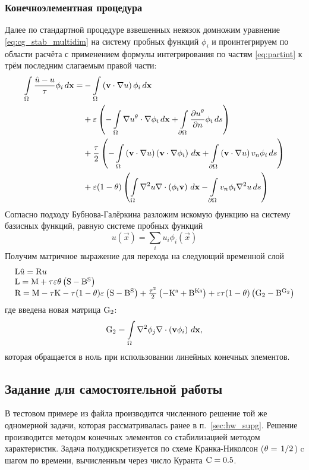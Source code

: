 \subsubsection{Конечноэлементная процедура}
Далее по стандартной процедуре взвешенных невязок
домножим уравнение \cref{eq:cg_stab_multidim} на систему пробных функций $\phi_i$
и проинтегрируем по области расчёта
с применением формулы интегрирования по частям \cref{eq:partint} к трём последним слагаемым правой части:
\begin{equation*}
\begin{split}
\displaystyle\int\limits_{\Omega}\frac{\hat u - u}{\tau}\phi_i \, d \boldsymbol{\rm x} = &
-\displaystyle\int\limits_{\Omega}\left(\boldsymbol{\rm v} \cdot \nabla u \right)\phi_i \, d \boldsymbol{\rm x} \\
&
+\varepsilon\left(
	-\displaystyle\int\limits_{\Omega}\nabla u^\theta \cdot \nabla \phi_i \, d \boldsymbol{\rm x}
	+ \displaystyle\int\limits_{\partial\Omega}\frac{\partial u^\theta}{\partial n}\phi_i \, d s
\right) \\
&
+\frac{\tau}{2}\left(
	-\displaystyle\int\limits_{\Omega}\left(\boldsymbol{\rm v} \cdot \nabla u\right)\left(\boldsymbol{\rm v}\cdot\nabla\phi_i\right) \, d \boldsymbol{\rm x}
	+\displaystyle\int\limits_{\partial\Omega}\left(\boldsymbol{\rm v} \cdot \nabla u\right) v_n \phi_i \, d s
\right)\\
&
+\varepsilon(1-\theta)\left(
\displaystyle\int\limits_{\Omega}\nabla^2 u \nabla\cdot\left(\phi_i \boldsymbol{\rm v}\right) \, d \boldsymbol{\rm x}
-\displaystyle\int\limits_{\partial\Omega}v_n \phi_i\nabla^2 u \, d s
\right)
\end{split}
\end{equation*}
Согласно подходу Бубнова-Галёркина
разложим искомую функцию на систему базисных
функций, равную системе пробных функций
$$
u(\vec x) = \sum_i u_i \phi_i(\vec x)
$$
Получим матричное выражение для перехода на следующий временной слой
\begin{equation}
\begin{array}{l}
{\rm L} \hat u = {\rm R} u \\
{\rm L} = {\rm M} + \tau\varepsilon\theta\left({\rm S} - {\rm B^S}\right) \\
{\rm R} = {\rm M} - \tau {\rm K} - \tau(1 - \theta)\varepsilon\left({\rm S} - {\rm B^S}\right)
+ \frac{\tau^2}{2}\left(-{\rm K^s} + {\rm B^{Ks}}\right)
+ \varepsilon\tau(1 - \theta)\left({\rm G}_2 - {\rm B^{G_2}}\right)
\end{array}
\end{equation}
где введена новая матрица ${\rm G}_2$:
\begin{equation*}
{\rm G}_2 = \displaystyle\int\limits_{\Omega}\nabla^2 \phi_j \nabla\cdot\left(\boldsymbol{\rm v} \phi_i\right) \, d \boldsymbol{\rm x},
\end{equation*}
которая обращается в ноль при использовании линейных конечных элементов.

\subsection{Задание для самостоятельной работы}
В тестовом примере 
из файла 
производится численного решение
той же одномерной задачи, которая рассматривалась
ранее в п.~\ref{sec:hw_supg}.
Решение производится методом конечных
элементов со стабилизацией методом
характеристик.
Задача полудискретизуется по схеме Кранка-Николсон ($\theta=\left.1\middle/2\right.$) c шагом по времени, вычисленным через число Куранта $\rm C = 0.5$.

